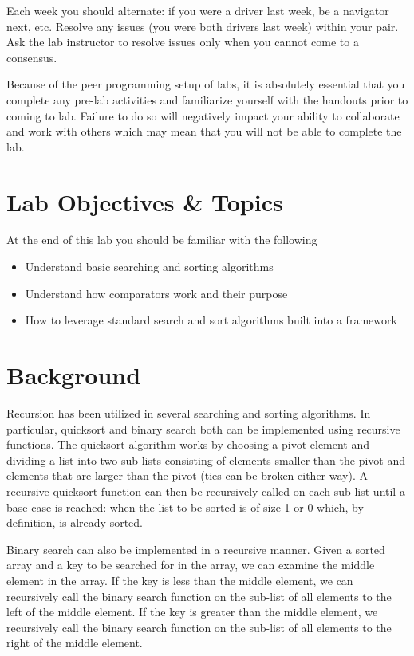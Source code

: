 \documentclass[12pt]{scrartcl}
\begin{document}
Each week you should alternate: if you were a driver last week, 
be a navigator next, etc.  Resolve any issues (you were both drivers
last week) within your pair.  Ask the lab instructor to resolve issues
only when you cannot come to a consensus.  

Because of the peer programming setup of labs, it is absolutely 
essential that you complete any pre-lab activities and familiarize
yourself with the handouts prior to coming to lab.  Failure to do
so will negatively impact your ability to collaborate and work with 
others which may mean that you will not be able to complete the
lab.  

\section{Lab Objectives \& Topics}
At the end of this lab you should be familiar with the following
\begin{itemize}
  \item Understand basic searching and sorting algorithms
  \item Understand how comparators work and their purpose
  \item How to leverage standard search and sort algorithms built into a framework
\end{itemize}

\section{Background}

Recursion has been utilized in several searching and sorting 
algorithms. In particular, quicksort and binary search both can 
be implemented using recursive functions.  The quicksort 
algorithm works by choosing a pivot element and dividing a 
list into two sub-lists consisting of elements smaller than the 
pivot and elements that are larger than the pivot (ties can be 
broken either way).  A recursive quicksort function can then 
be recursively called on each sub-list until a base case is 
reached: when the list to be sorted is of size 1 or 0 which, 
by definition, is already sorted.

Binary search can also be implemented in a recursive manner.  
Given a sorted array and a key to be searched for in the array, 
we can examine the middle element in the array.  If the key is 
less than the middle element, we can recursively call the binary 
search function on the sub-list of all elements to the left of the 
middle element.  If the key is greater than the middle element, 
we recursively call the binary search function on the sub-list of 
all elements to the right of the middle element.
\end{document}
